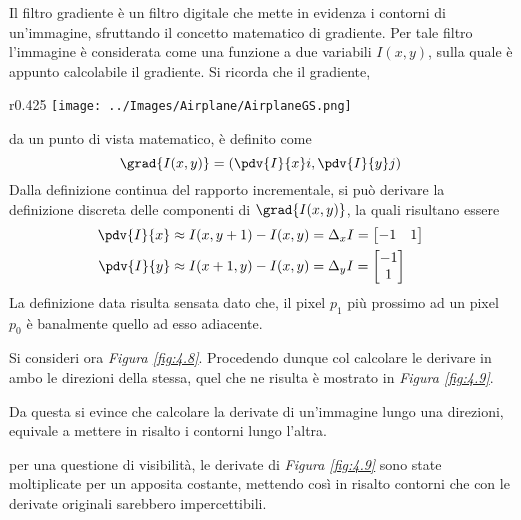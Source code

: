 \documentclass{subfiles}
\begin{document}
Il filtro gradiente è un filtro digitale che mette in evidenza i contorni di un'immagine, sfruttando il concetto matematico di gradiente.
Per tale filtro l'immagine è considerata come una funzione a due variabili \(I(x,y)\), sulla quale è appunto calcolabile il gradiente.
Si ricorda che il gradiente,
\begin{wrapfigure}[16]{r}{0.425\textwidth}
    \centering
    \texttt{[image: ../Images/Airplane/AirplaneGS.png]}
    \caption{AirplaneGS}
    \label{fig:4.8}
\end{wrapfigure}
da un punto di vista matematico, è definito come
\[
    \grad{I(x,y)} = \left(\pdv{I}{x} i, \pdv{I}{y} j\right)
\]
Dalla definizione continua del rapporto incrementale, si può derivare la definizione discreta delle componenti di \(\grad{I(x, y)}\), la quali risultano essere
\[\begin{aligned}
        \pdv{I}{x} & \approx I(x, y+1) - I(x, y) = \Delta_{x}I = \begin{bmatrix}
                                                                     -1 & 1 \\
                                                                 \end{bmatrix}   \\
        \pdv{I}{y} & \approx I(x + 1, y) - I(x, y) = \Delta_{y}I = \begin{bmatrix}
                                                                       -1 \\
                                                                       1  \\
                                                                   \end{bmatrix}
    \end{aligned}\]
La definizione data risulta sensata dato che, il pixel \(p_{1}\) più prossimo ad un pixel \(p_{0}\) è banalmente quello ad esso adiacente.

Si consideri ora \emph{Figura \ref{fig:4.8}}. Procedendo dunque col calcolare le derivare in ambo le direzioni della stessa,
quel che ne risulta è mostrato in \emph{Figura \ref{fig:4.9}}.

Da questa si evince che calcolare la derivate di un'immagine lungo una direzioni, equivale a mettere in risalto i contorni lungo l'altra.

\begin{Remark*}
    per una questione di visibilità, le derivate di \emph{Figura \ref{fig:4.9}} sono state moltiplicate per un apposita costante,
    mettendo così in risalto contorni che con le derivate originali sarebbero impercettibili.
\end{Remark*}
\end{document}
